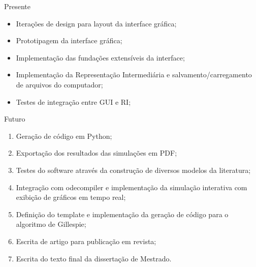 \begin{frame}{Presente}
    \begin{itemize}
        \item Iterações de design para layout da interface gráfica;
        \item Prototipagem da interface gráfica;
        \item Implementação das fundações extensíveis da interface;
        \item Implementação da Representação Intermediária e salvamento/carregamento de arquivos do computador;
        \item Testes de integração entre GUI e RI;
    \end{itemize}
\end{frame}

\begin{frame}{Futuro}
    \begin{enumerate}
        \item \label{cro::geracao-codigo-python-I} Geração de código em Python;
        \item \label{cro::exportacao-pdf-II} Exportação dos resultados das simulações em PDF;
        \item \label{cro::testes-III} Testes do software através da construção de diversos modelos da literatura;
        \item \label{cro::simulacao-onsite-IV} Integração com odecompiler e implementação da simulação interativa com exibição de gráficos em tempo real;
        \item \label{cro::gillespie-V} Definição do template e implementação da geração de código para o algoritmo de Gillespie; 
        \item \label{cro::artigo-VI} Escrita de artigo para publicação em revista; 
        \item \label{cro::escrita-dissertacao-VII} Escrita do texto final da dissertação de Mestrado.
    \end{enumerate}
\end{frame}

